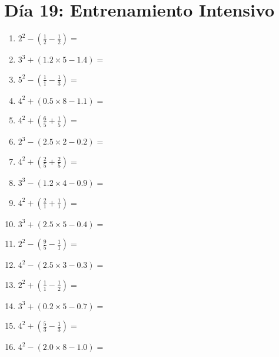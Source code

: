 \documentclass[12pt]{article}
\begin{document}
\section*{Día 19: Entrenamiento Intensivo}
\begin{enumerate}
\item \large $ 2^{2} - (\frac{1}{2} - \frac{1}{2}) = $ \vspace{1.6cm}
\item \large $ 3^{3} + (1.2 \times 5 - 1.4) = $ \vspace{1.6cm}
\item \large $ 5^{2} - (\frac{1}{1} - \frac{1}{3}) = $ \vspace{1.6cm}
\item \large $ 4^{2} + (0.5 \times 8 - 1.1) = $ \vspace{1.6cm}
\item \large $ 4^{2} + (\frac{6}{5} + \frac{1}{5}) = $ \vspace{1.6cm}
\item \large $ 2^{3} - (2.5 \times 2 - 0.2) = $ \vspace{1.6cm}
\item \large $ 4^{2} + (\frac{2}{5} + \frac{2}{5}) = $ \vspace{1.6cm}
\item \large $ 3^{3} - (1.2 \times 4 - 0.9) = $ \vspace{1.6cm}
\item \large $ 4^{2} + (\frac{2}{1} + \frac{1}{1}) = $ \vspace{1.6cm}
\item \large $ 3^{3} + (2.5 \times 5 - 0.4) = $ \vspace{1.6cm}
\newpage
\item \large $ 2^{2} - (\frac{9}{5} - \frac{1}{1}) = $ \vspace{1.6cm}
\item \large $ 4^{2} - (2.5 \times 3 - 0.3) = $ \vspace{1.6cm}
\item \large $ 2^{2} + (\frac{1}{1} - \frac{1}{2}) = $ \vspace{1.6cm}
\item \large $ 3^{3} + (0.2 \times 5 - 0.7) = $ \vspace{1.6cm}
\item \large $ 4^{2} + (\frac{5}{3} - \frac{1}{3}) = $ \vspace{1.6cm}
\item \large $ 4^{2} - (2.0 \times 8 - 1.0) = $ \vspace{1.6cm}

\end{enumerate}
\end{document}

